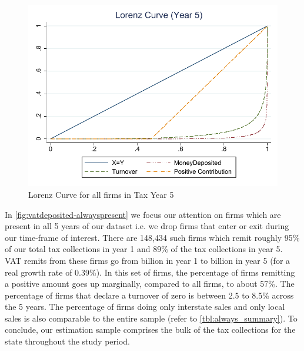 \begin{figure}[h]
\scriptsize
\centering
\includegraphics[width=.7\textwidth]{graphs/LorenzCurve_TaxYear5.pdf}
\caption{Lorenz Curve for all firms in Tax Year 5}
\label{fig:lorenzyear5}
\end{figure}

In \cref{fig:vatdeposited-alwayspresent} we focus our attention on firms which are present in all 5 years of our dataset i.e. we drop firms that enter or exit during our time-frame of interest. There are 148,434 such firms which remit roughly 95\% of our total tax collections in year 1 and 89\% of the tax collections in year 5. VAT
remits from these firms go from  billion in year 1 to  billion in year 5 (for a real growth rate of 0.39\%). In this set of firms, the percentage of firms remitting a positive amount goes up marginally, compared to all firms, to about 57\%. The percentage of firms that declare a turnover of zero is
between 2.5 to 8.5\% across the 5 years. The percentage of firms doing only interstate sales and only local sales is also comparable to the entire sample (refer to \cref{tbl:always_summary}). To conclude, our estimation sample comprises the bulk of the tax collections for the state throughout the study period. 




